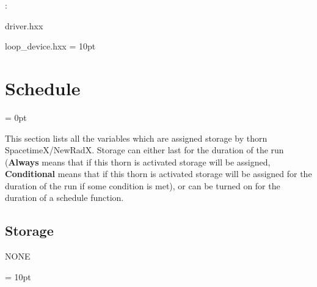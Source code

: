 : 

driver.hxx

loop\_device.hxx
\vspace{2mm}\parskip = 10pt 

\section{Schedule} 


\parskip = 0pt


\noindent This section lists all the variables which are assigned storage by thorn SpacetimeX/NewRadX.  Storage can either last for the duration of the run ({\bf Always} means that if this thorn is activated storage will be assigned, {\bf Conditional} means that if this thorn is activated storage will be assigned for the duration of the run if some condition is met), or can be turned on for the duration of a schedule function.


\subsection*{Storage}NONE

\vspace{5mm}\parskip = 10pt 

